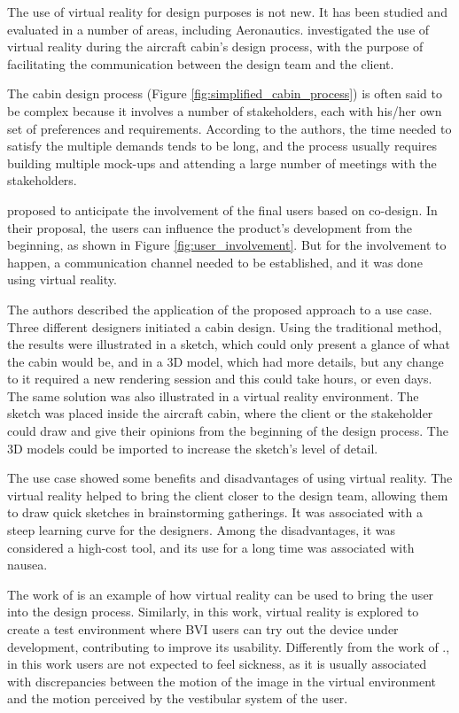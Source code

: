 
The use of virtual reality for design purposes is not new. It has been studied and evaluated in a number of areas, including Aeronautics.  investigated the use of virtual reality during the aircraft cabin’s design process, with the purpose of facilitating the communication between the design team and the client. 

The cabin design process (Figure \ref{fig:simplified_cabin_process}) is often said to be complex because it involves a number of stakeholders, each with his/her own set of preferences and requirements. According to the authors, the time needed to satisfy the multiple demands tends to be long, and the process usually requires building multiple mock-ups and attending a large number of meetings with the stakeholders. 



 proposed to anticipate the involvement of the final users based on co-design. In their proposal, the users can influence the product’s development from the beginning, as shown in Figure \ref{fig:user_involvement}. But for the involvement to happen, a communication channel needed to be established, and it was done using virtual reality.



The authors described the application of the proposed approach to a use case. Three different designers initiated a cabin design. Using the traditional method, the results were illustrated in a sketch, which could only present a glance of what the cabin would be, and in a 3D model, which had more details, but any change to it required a new rendering session and this could take hours, or even days. The same solution was also illustrated in a virtual reality environment. The sketch was placed inside the aircraft cabin, where the client or the stakeholder could draw and give their opinions from the beginning of the design process. The 3D models could be imported to increase the sketch’s level of detail.

The use case showed some benefits and disadvantages of using virtual reality. The virtual reality helped to bring the client closer to the design team, allowing them to draw quick sketches in brainstorming gatherings. It was associated with a steep learning curve for the designers. Among the disadvantages, it was considered a high-cost tool, and its use for a long time was associated with nausea. 

The work of  is an example of how virtual reality can be used to bring the user into the design process. Similarly, in this work, virtual reality is explored to create a test environment where BVI users can try out the device under development, contributing to improve its usability. Differently from the work of ., in this work users are not expected to feel sickness, as it is usually associated with discrepancies between the motion of the image in the virtual environment and the motion perceived by the vestibular system of the user.